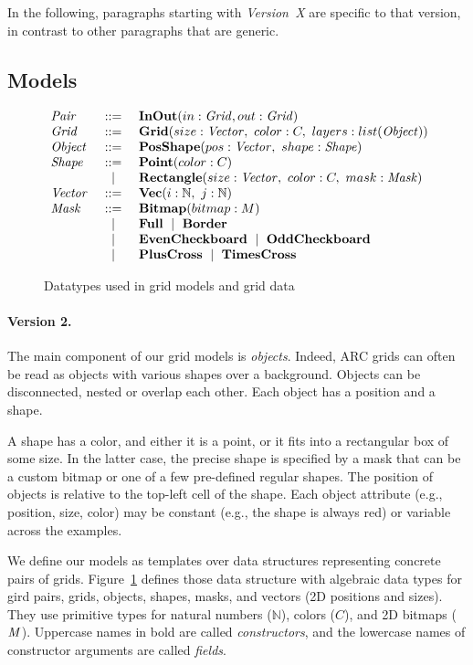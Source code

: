 \documentclass[a4paper]{llncs}
\newenvironment{datatype}{$\begin{array}{lcl}}{\end{array}$}
\newcommand{\is}{&\ ::=\ &}
\newcommand{\alter}{\ \mid\ }
\newcommand{\altis}{\\ &\ \mid\ &}
\newcommand{\nat}{\mathbb{N}}
\begin{document}
In the following, paragraphs starting with {\em Version~X} are
specific to that version, in contrast to other paragraphs that are
generic.

\subsection{Models}
\label{model}

\begin{figure}[t]
\begin{center}
\begin{datatype}
  {\it Pair} \is {\bf InOut}(in: {\it Grid}, out: {\it Grid})
  \\
  {\it Grid} \is {\bf Grid}(size: {\it Vector},\ color: C,\ layers: list({\it Object}))
  \\
  {\it Object} \is {\bf PosShape}(pos: {\it Vector},\ shape: {\it Shape})
  \\
  {\it Shape} \is {\bf Point}(color: C)
  \altis {\bf Rectangle}(size: {\it Vector},\ color: C,\ mask: {\it Mask})
  \\
  {\it Vector} \is {\bf Vec}(i: \nat,\ j: \nat)
  \\
  {\it Mask} \is {\bf Bitmap}(bitmap: M)
  \altis {\bf Full} \alter {\bf Border}
  \altis {\bf EvenCheckboard} \alter {\bf OddCheckboard}
  \altis {\bf PlusCross} \alter {\bf TimesCross}
\end{datatype}
\end{center}
\caption{Datatypes used in grid models and grid data}
\label{fig:patterns}
\end{figure}

\paragraph{Version 2.}
The main component of our grid models is {\em objects}. Indeed, ARC
grids can often be read as objects with various shapes over a
background. Objects can be disconnected, nested or overlap each
other. Each object has a position and a shape.

A shape has a color, and either it is a point, or it fits into a
rectangular box of some size. In the latter case, the precise shape is
specified by a mask that can be a custom bitmap or one of a few
pre-defined regular shapes. The position of objects is relative to the
top-left cell of the shape. Each object attribute (e.g., position,
size, color) may be constant (e.g., the shape is always red) or
variable across the examples.

We define our models as templates over data structures representing
concrete pairs of grids. Figure~\ref{fig:patterns} defines those data
structure with algebraic data types for gird pairs, grids, objects,
shapes, masks, and vectors (2D positions and sizes). They use
primitive types for natural numbers ($\nat$), colors ($C$), and 2D
bitmaps (${\it M}$). Uppercase names in bold are called {\em
  constructors}, and the lowercase names of constructor arguments are
called {\em fields}.
\end{document}
